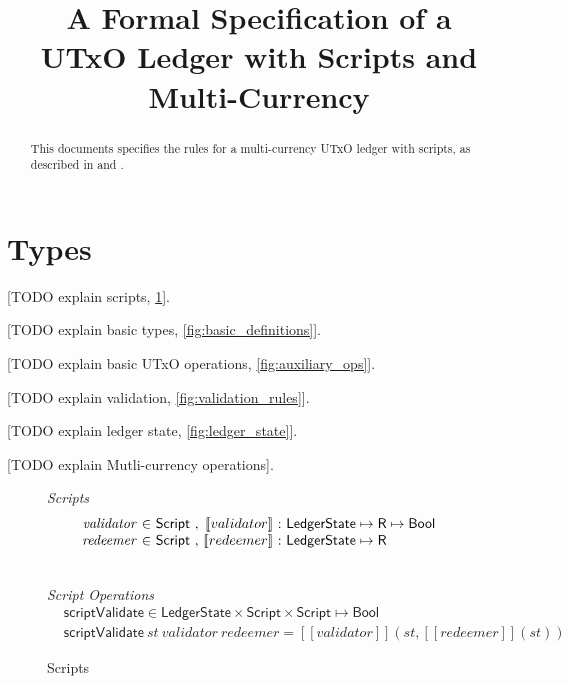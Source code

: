 \documentclass[11pt,a4paper]{article}
\newcommand{\var}[1]{\mathit{#1}}
\newcommand{\fun}[1]{\mathsf{#1}}
\newcommand{\type}[1]{\mathsf{#1}}
\newcommand{\Bool}{\type{Bool}}
\newcommand{\Script}{\type{Script}}
\newcommand{\ScriptEval}[1]{[\![ #1 ]\!]}
\newcommand{\scriptValidate}[3]{\fun{scriptValidate} ~ \var{#1} ~ \var{#2} ~ \var{#3}}
\begin{document}
\title{A Formal Specification of a \\
       UTxO Ledger with Scripts and Multi-Currency}

\author{}


\maketitle

\begin{abstract}
This documents specifies the rules for a multi-currency UTxO ledger with scripts, as described in \cite{multi_currency} and \cite{utxo_scripts}.
\end{abstract}

\tableofcontents
\listoffigures

\section{Types}

[TODO explain scripts, \cref{fig:scripts}].

[TODO explain basic types, \cref{fig:basic_definitions}].

[TODO explain basic UTxO operations, \cref{fig:auxiliary_ops}].

[TODO explain validation, \cref{fig:validation_rules}].

[TODO explain ledger state, \cref{fig:ledger_state}].

[TODO explain Mutli-currency operations].

\begin{figure}
\emph{Scripts}
%
\begin{equation*}
\begin{array}{r@{~\in~}l@{~,~}r@{~:~}l}
  \var{validator}
& \Script
& \ScriptEval{validator}
& \type{LedgerState} \mapsto \type{R} \mapsto \Bool
\\
  \var{redeemer}
& \Script
& \ScriptEval{redeemer}
& \type{LedgerState} \mapsto \type{R}
\end{array}
\end{equation*}

~ ~ ~  \type{R}
\\

\emph{Script Operations}
\begin{align*}
& \fun{scriptValidate} \in
  \type{LedgerState} \times \Script \times \Script \mapsto \Bool \\
& \scriptValidate{st}{validator}{redeemer} =
\ScriptEval{validator} \left(st, \ScriptEval{redeemer}\left(st\right)\right)
\end{align*}

\caption{Scripts}
\label{fig:scripts}
\end{figure}
\end{document}
